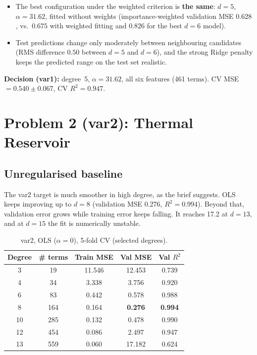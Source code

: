 \documentclass[11pt,a4paper]{article}
\begin{document}
\begin{itemize}
  \item The best configuration under the weighted criterion is \textbf{the same}:
        $d{=}5$, $\alpha{=}31.62$, fitted without weights
        (importance-weighted validation MSE $0.628$, vs.\ $0.675$ with weighted
        fitting and $0.826$ for the best $d{=}6$ model).
  \item Test predictions change only moderately between neighbouring candidates
        (RMS difference $0.50$ between $d{=}5$ and $d{=}6$), and the strong Ridge
        penalty keeps the predicted range on the test set realistic.
\end{itemize}

\noindent\textbf{Decision (var1):} degree~5, $\alpha = 31.62$, all six features
(461 terms). CV MSE $=0.540\pm0.067$, CV $R^2=0.947$.

\section{Problem 2 (var2): Thermal Reservoir}

\subsection{Unregularised baseline}
The var2 target is much smoother in high degree, as the brief suggests. OLS keeps
improving up to $d{=}8$ (validation MSE 0.276, $R^2 = 0.994$). Beyond that, validation
error grows while training error keeps falling. It reaches 17.2 at $d{=}13$, and at
$d{=}15$ the fit is numerically unstable.

\begin{table}[H]
\centering
\small
\begin{tabular}{ccccc}
\toprule
Degree & \# terms & Train MSE & Val MSE & Val $R^2$ \\
\midrule
3  & 19  & 11.546 & 12.453 & 0.739 \\
4  & 34  & 3.338  & 3.756  & 0.920 \\
6  & 83  & 0.442  & 0.578  & 0.988 \\
8  & 164 & 0.164  & \textbf{0.276} & \textbf{0.994} \\
10 & 285 & 0.132  & 0.478  & 0.990 \\
12 & 454 & 0.086  & 2.497  & 0.947 \\
13 & 559 & 0.060  & 17.182 & 0.624 \\
\bottomrule
\end{tabular}
\caption{var2, OLS ($\alpha{=}0$), 5-fold CV (selected degrees).}
\label{tab:v2ols}
\end{table}
\end{document}
